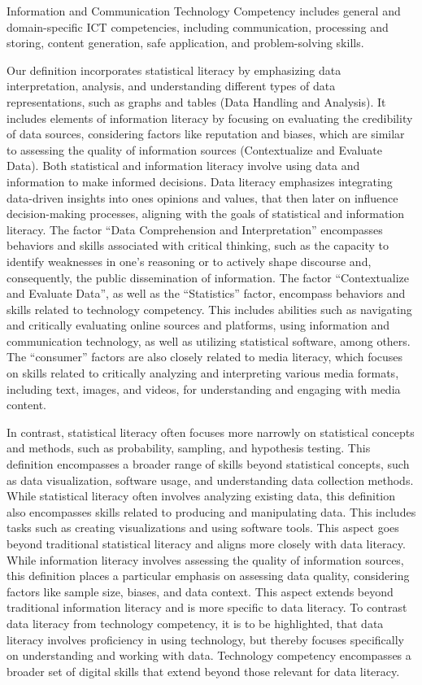 \documentclass[
  12pt,
  a4paper,
  twoside]{article}
\begin{document}
Information and Communication Technology Competency includes general and domain-specific ICT competencies, including communication, processing and storing, content generation, safe application, and problem-solving skills.

Our definition incorporates statistical literacy by emphasizing data interpretation, analysis, and understanding different types of data representations, such as graphs and tables (Data Handling and Analysis). It includes elements of information literacy by focusing on evaluating the credibility of data sources, considering factors like reputation and biases, which are similar to assessing the quality of information sources (Contextualize and Evaluate Data).
Both statistical and information literacy involve using data and information to make informed decisions. Data literacy emphasizes integrating data-driven insights into ones opinions and values, that then later on influence decision-making processes, aligning with the goals of statistical and information literacy. The factor ``Data Comprehension and Interpretation'' encompasses behaviors and skills associated with critical thinking, such as the capacity to identify weaknesses in one's reasoning or to actively shape discourse and, consequently, the public dissemination of information. The factor ``Contextualize and Evaluate Data'', as well as the ``Statistics'' factor, encompass behaviors and skills related to technology competency. This includes abilities such as navigating and critically evaluating online sources and platforms, using information and communication technology, as well as utilizing statistical software, among others. The ``consumer'' factors are also closely related to media literacy, which focuses on skills related to critically analyzing and interpreting various media formats, including text, images, and videos, for understanding and engaging with media content.

In contrast, statistical literacy often focuses more narrowly on statistical concepts and methods, such as probability, sampling, and hypothesis testing. This definition encompasses a broader range of skills beyond statistical concepts, such as data visualization, software usage, and understanding data collection methods. While statistical literacy often involves analyzing existing data, this definition also encompasses skills related to producing and manipulating data. This includes tasks such as creating visualizations and using software tools. This aspect goes beyond traditional statistical literacy and aligns more closely with data literacy. While information literacy involves assessing the quality of information sources, this definition places a particular emphasis on assessing data quality, considering factors like sample size, biases, and data context. This aspect extends beyond traditional information literacy and is more specific to data literacy. To contrast data literacy from technology competency, it is to be highlighted, that data literacy involves proficiency in using technology, but thereby focuses specifically on understanding and working with data. Technology competency encompasses a broader set of digital skills that extend beyond those relevant for data literacy.
\end{document}
